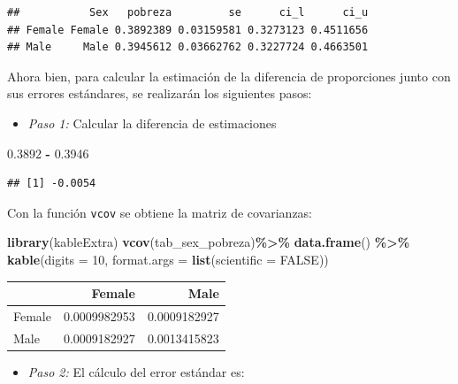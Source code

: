 \documentclass[
  12pt,
]{book}
\newenvironment{Shaded}{\begin{snugshade}}{\end{snugshade}}
\newcommand{\AttributeTok}[1]{\textcolor[rgb]{0.13,0.29,0.53}{#1}}
\newcommand{\ConstantTok}[1]{\textcolor[rgb]{0.56,0.35,0.01}{#1}}
\newcommand{\DecValTok}[1]{\textcolor[rgb]{0.00,0.00,0.81}{#1}}
\newcommand{\FloatTok}[1]{\textcolor[rgb]{0.00,0.00,0.81}{#1}}
\newcommand{\FunctionTok}[1]{\textcolor[rgb]{0.13,0.29,0.53}{\textbf{#1}}}
\newcommand{\NormalTok}[1]{#1}
\newcommand{\SpecialCharTok}[1]{\textcolor[rgb]{0.81,0.36,0.00}{\textbf{#1}}}
\providecommand{\tightlist}{%
  \setlength{\itemsep}{0pt}\setlength{\parskip}{0pt}}
\begin{document}
\begin{verbatim}
##           Sex   pobreza         se      ci_l      ci_u
## Female Female 0.3892389 0.03159581 0.3273123 0.4511656
## Male     Male 0.3945612 0.03662762 0.3227724 0.4663501
\end{verbatim}

Ahora bien, para calcular la estimación de la diferencia de proporciones junto con sus errores estándares, se realizarán los siguientes pasos:

\begin{itemize}
\tightlist
\item
  \emph{Paso 1:} Calcular la diferencia de estimaciones
\end{itemize}

\begin{Shaded}
\begin{Highlighting}[]
\FloatTok{0.3892} \SpecialCharTok{{-}} \FloatTok{0.3946}          
\end{Highlighting}
\end{Shaded}

\begin{verbatim}
## [1] -0.0054
\end{verbatim}

Con la función \texttt{vcov} se obtiene la matriz de covarianzas:

\begin{Shaded}
\begin{Highlighting}[]
\FunctionTok{library}\NormalTok{(kableExtra)}
\FunctionTok{vcov}\NormalTok{(tab\_sex\_pobreza)}\SpecialCharTok{\%\textgreater{}\%} \FunctionTok{data.frame}\NormalTok{() }\SpecialCharTok{\%\textgreater{}\%} 
  \FunctionTok{kable}\NormalTok{(}\AttributeTok{digits =} \DecValTok{10}\NormalTok{,}
        \AttributeTok{format.args =} \FunctionTok{list}\NormalTok{(}\AttributeTok{scientific =} \ConstantTok{FALSE}\NormalTok{))}
\end{Highlighting}
\end{Shaded}

\begin{tabular}{l|r|r}
\hline
  & Female & Male\\
\hline
Female & 0.0009982953 & 0.0009182927\\
\hline
Male & 0.0009182927 & 0.0013415823\\
\hline
\end{tabular}

\begin{itemize}
\tightlist
\item
  \emph{Paso 2:} El cálculo del error estándar es:
\end{itemize}
\end{document}

